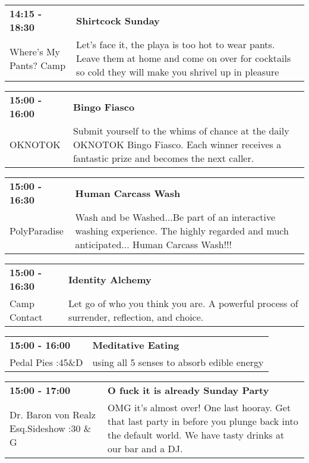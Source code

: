 \begin{tabular}{ p{1in} p{2.2in} }
    \textbf{14:15 - 18:30} & \textbf{Shirtcock Sunday} \\
    Where's My Pants? Camp \newline  & Let's face it, the playa is too hot to wear pants. Leave them at home and come on over for cocktails so cold they will make you shrivel up in pleasure \\
    \hline 
\end{tabular}
    
\begin{tabular}{ p{1in} p{2.2in} }
    \textbf{15:00 - 16:00} & \textbf{Bingo Fiasco} \\
    OKNOTOK \newline  & Submit yourself to the whims of chance at the daily OKNOTOK Bingo Fiasco. Each winner receives a fantastic prize and becomes the next caller. \\
    \hline 
\end{tabular}
    
\begin{tabular}{ p{1in} p{2.2in} }
    \textbf{15:00 - 16:30} & \textbf{Human Carcass Wash} \\
    PolyParadise \newline  & Wash and be Washed...Be part of an interactive washing experience.
The highly regarded and much anticipated... Human Carcass Wash!!! \\
    \hline 
\end{tabular}
    
\begin{tabular}{ p{1in} p{2.2in} }
    \textbf{15:00 - 16:30} & \textbf{Identity Alchemy} \\
    Camp Contact \newline  & Let go of who you think you are. A powerful process of surrender, reflection, and choice. \\
    \hline 
\end{tabular}
    
\begin{tabular}{ p{1in} p{2.2in} }
    \textbf{15:00 - 16:00} & \textbf{Meditative Eating} \\
    Pedal Pies \newline 4:45\&D & using all 5 senses to absorb edible energy \\
    \hline 
\end{tabular}
    
\begin{tabular}{ p{1in} p{2.2in} }
    \textbf{15:00 - 17:00} & \textbf{O fuck it is already Sunday Party} \\
    Dr. Baron von Realz Esq.Sideshow \newline 4:30 \& G & OMG it's almost over! One last hooray. Get that last party in before you plunge back into the default world. We have tasty drinks at our bar and a DJ. \\
    \hline 
\end{tabular}
    
